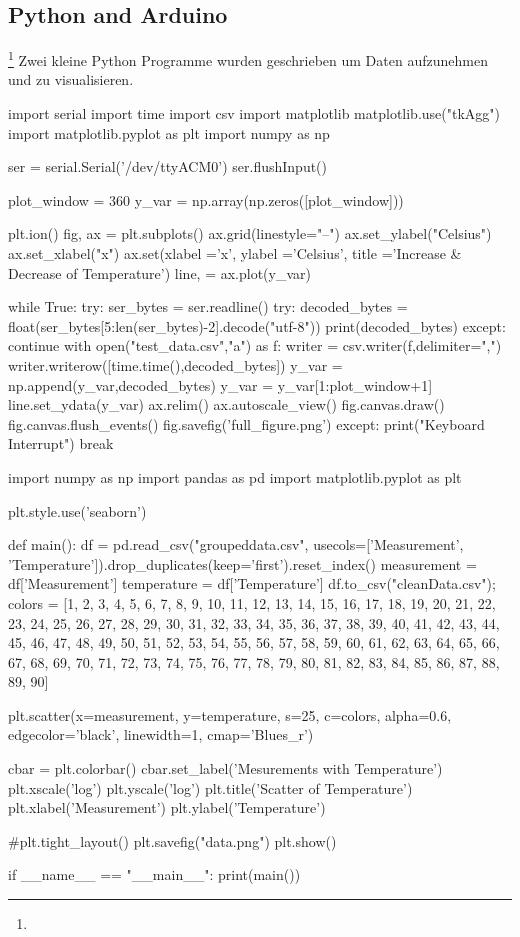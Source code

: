 \documentclass[12pt]{article}
\begin{document}
\subsection{Python and Arduino}\footnote{}
Zwei kleine Python Programme wurden geschrieben um Daten aufzunehmen und zu visualisieren.
\begin{python}[language=Python]
import serial
import time
import csv
import matplotlib
matplotlib.use("tkAgg")
import matplotlib.pyplot as plt
import numpy as np

ser = serial.Serial('/dev/ttyACM0')
ser.flushInput()

plot_window = 360
y_var = np.array(np.zeros([plot_window]))

plt.ion()
fig, ax = plt.subplots()
ax.grid(linestyle="--")
ax.set_ylabel("Celsius")
ax.set_xlabel("x")
ax.set(xlabel ='x', ylabel ='Celsius',
       title ='Increase & Decrease of \n Temperature')
line, = ax.plot(y_var)

while True:
    try:
        ser_bytes = ser.readline()
        try:
            decoded_bytes = float(ser_bytes[5:len(ser_bytes)-2].decode("utf-8"))
            print(decoded_bytes)
        except:
            continue
        with open("test_data.csv","a") as f:
            writer = csv.writer(f,delimiter=",")
            writer.writerow([time.time(),decoded_bytes])
        y_var = np.append(y_var,decoded_bytes)
        y_var = y_var[1:plot_window+1]
        line.set_ydata(y_var)
        ax.relim()
        ax.autoscale_view()
        fig.canvas.draw()
        fig.canvas.flush_events()
        fig.savefig('full_figure.png')
    except:
        print("Keyboard Interrupt")
        break
\end{python}
\newpage
\begin{python}
import numpy as np
import pandas as pd
import matplotlib.pyplot as plt

plt.style.use('seaborn')


def main():
    df = pd.read_csv("groupeddata.csv", usecols=['Measurement', 'Temperature']).drop_duplicates(keep='first').reset_index()
    measurement = df['Measurement']
    temperature = df['Temperature']
    df.to_csv("cleanData.csv");
    colors = [1, 2, 3, 4, 5, 6, 7, 8, 9, 10, 11, 12, 13, 14, 15, 16, 17, 18, 19, 20, 21, 22, 23, 24, 25, 26, 27, 28, 29, 30, 31, 32, 33, 34, 35, 36, 37, 38, 39, 40, 41, 42, 43, 44, 45, 46, 47, 48, 49, 50, 51, 52, 53, 54, 55, 56, 57, 58, 59, 60, 61, 62, 63, 64, 65, 66, 67, 68, 69, 70, 71, 72, 73, 74, 75, 76, 77, 78, 79, 80, 81, 82, 83, 84, 85, 86, 87, 88, 89, 90]

    plt.scatter(x=measurement, y=temperature, s=25, c=colors, alpha=0.6, edgecolor='black', linewidth=1,
                    cmap='Blues_r')

    cbar = plt.colorbar()
    cbar.set_label('Mesurements with Temperature')
    plt.xscale('log')
    plt.yscale('log')
    plt.title('Scatter of Temperature')
    plt.xlabel('Measurement')
    plt.ylabel('Temperature')

    #plt.tight_layout()
    plt.savefig("data.png")
    plt.show()


if __name__ == "__main__":
    print(main())

\end{python}
\end{document}
